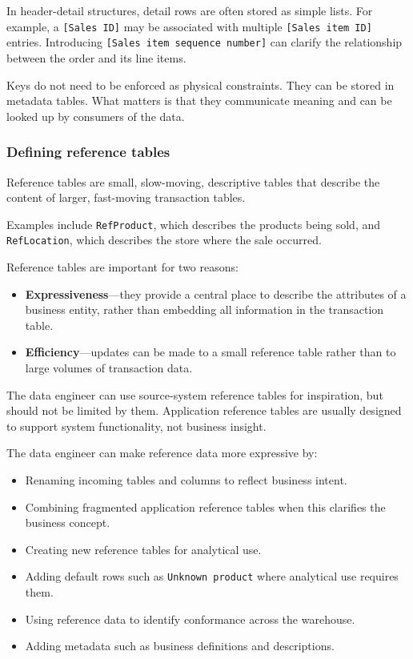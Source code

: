 \documentclass[10pt,openany,10pt]{book}
\providecommand{\tightlist}{%
  \setlength{\itemsep}{0pt}\setlength{\parskip}{0pt}}
\begin{document}
In header-detail structures, detail rows are often stored as simple
lists. For example, a \texttt{{[}Sales\ ID{]}} may be associated with
multiple \texttt{{[}Sales\ item\ ID{]}} entries. Introducing
\texttt{{[}Sales\ item\ sequence\ number{]}} can clarify the
relationship between the order and its line items.

Keys do not need to be enforced as physical constraints. They can be
stored in metadata tables. What matters is that they communicate meaning
and can be looked up by consumers of the data.

\subsubsection{Defining reference
tables}\label{defining-reference-tables}

Reference tables are small, slow-moving, descriptive tables that
describe the content of larger, fast-moving transaction tables.

Examples include \texttt{RefProduct}, which describes the products being
sold, and \texttt{RefLocation}, which describes the store where the sale
occurred.

Reference tables are important for two reasons:

\begin{itemize}
\tightlist
\item
  \textbf{Expressiveness}---they provide a central place to describe the
  attributes of a business entity, rather than embedding all information
  in the transaction table.
\item
  \textbf{Efficiency}---updates can be made to a small reference table
  rather than to large volumes of transaction data.
\end{itemize}

The data engineer can use source-system reference tables for
inspiration, but should not be limited by them. Application reference
tables are usually designed to support system functionality, not
business insight.

The data engineer can make reference data more expressive by:

\begin{itemize}
\tightlist
\item
  Renaming incoming tables and columns to reflect business intent.
\item
  Combining fragmented application reference tables when this clarifies
  the business concept.
\item
  Creating new reference tables for analytical use.
\item
  Adding default rows such as \texttt{Unknown\ product} where analytical
  use requires them.
\item
  Using reference data to identify conformance across the warehouse.
\item
  Adding metadata such as business definitions and descriptions.
\end{itemize}
\end{document}
